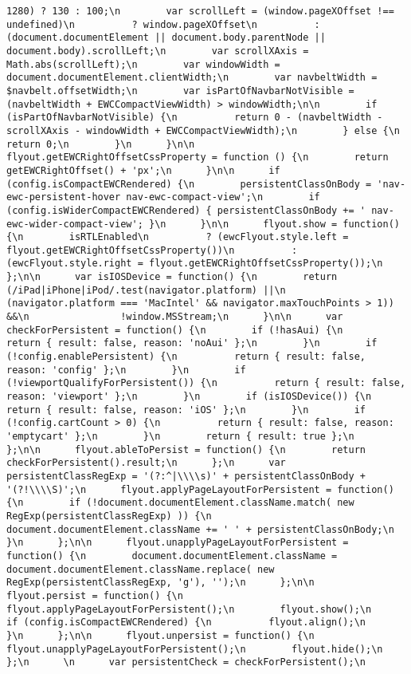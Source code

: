\documentclass[
]{article}
\begin{document}
\begin{verbatim}
1280) ? 130 : 100;\n        var scrollLeft = (window.pageXOffset !== undefined)\n          ? window.pageXOffset\n          : (document.documentElement || document.body.parentNode || document.body).scrollLeft;\n        var scrollXAxis = Math.abs(scrollLeft);\n        var windowWidth = document.documentElement.clientWidth;\n        var navbeltWidth = $navbelt.offsetWidth;\n        var isPartOfNavbarNotVisible = (navbeltWidth + EWCCompactViewWidth) > windowWidth;\n\n        if (isPartOfNavbarNotVisible) {\n          return 0 - (navbeltWidth - scrollXAxis - windowWidth + EWCCompactViewWidth);\n        } else {\n          return 0;\n        }\n      }\n\n      flyout.getEWCRightOffsetCssProperty = function () {\n        return getEWCRightOffset() + 'px';\n      }\n\n      if (config.isCompactEWCRendered) {\n        persistentClassOnBody = 'nav-ewc-persistent-hover nav-ewc-compact-view';\n        if (config.isWiderCompactEWCRendered) { persistentClassOnBody += ' nav-ewc-wider-compact-view'; }\n      }\n\n      flyout.show = function() {\n        isRTLEnabled\n          ? (ewcFlyout.style.left = flyout.getEWCRightOffsetCssProperty())\n          : (ewcFlyout.style.right = flyout.getEWCRightOffsetCssProperty());\n      };\n\n      var isIOSDevice = function() {\n        return (/iPad|iPhone|iPod/.test(navigator.platform) ||\n                (navigator.platform === 'MacIntel' && navigator.maxTouchPoints > 1)) &&\n                !window.MSStream;\n      }\n\n      var checkForPersistent = function() {\n        if (!hasAui) {\n          return { result: false, reason: 'noAui' };\n        }\n        if (!config.enablePersistent) {\n          return { result: false, reason: 'config' };\n        }\n        if (!viewportQualifyForPersistent()) {\n          return { result: false, reason: 'viewport' };\n        }\n        if (isIOSDevice()) {\n          return { result: false, reason: 'iOS' };\n        }\n        if (!config.cartCount > 0) {\n          return { result: false, reason: 'emptycart' };\n        }\n        return { result: true };\n      };\n\n      flyout.ableToPersist = function() {\n        return checkForPersistent().result;\n      };\n      var persistentClassRegExp = '(?:^|\\\\s)' + persistentClassOnBody + '(?!\\\\S)';\n      flyout.applyPageLayoutForPersistent = function() {\n        if (!document.documentElement.className.match( new RegExp(persistentClassRegExp) )) {\n          document.documentElement.className += ' ' + persistentClassOnBody;\n        }\n      };\n\n      flyout.unapplyPageLayoutForPersistent = function() {\n        document.documentElement.className = document.documentElement.className.replace( new RegExp(persistentClassRegExp, 'g'), '');\n      };\n\n      flyout.persist = function() {\n        flyout.applyPageLayoutForPersistent();\n        flyout.show();\n        if (config.isCompactEWCRendered) {\n          flyout.align();\n        }\n      };\n\n      flyout.unpersist = function() {\n        flyout.unapplyPageLayoutForPersistent();\n        flyout.hide();\n      };\n      \n      var persistentCheck = checkForPersistent();\n   
\end{verbatim}
\end{document}
